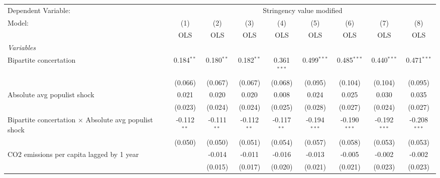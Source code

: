 
\begingroup
\centering
\begin{tabular}{lcccccccc}
   \toprule
   Dependent Variable: & \multicolumn{8}{c}{Stringency value modified}\\
   Model:                                                       & (1)           & (2)           & (3)           & (4)           & (5)            & (6)            & (7)            & (8)\\  
                                                                &  OLS          & OLS           & OLS           & OLS           & OLS            & OLS            & OLS            & OLS\\  
   \midrule
   \emph{Variables}\\
   Bipartite concertation                                       & 0.184$^{**}$  & 0.180$^{**}$  & 0.182$^{**}$  & 0.361$^{***}$ & 0.499$^{***}$  & 0.485$^{***}$  & 0.440$^{***}$  & 0.471$^{***}$\\   
                                                                & (0.066)       & (0.067)       & (0.067)       & (0.068)       & (0.095)        & (0.104)        & (0.104)        & (0.095)\\   
   Absolute avg populist shock                                  & 0.021         & 0.020         & 0.020         & 0.008         & 0.024          & 0.025          & 0.030          & 0.035\\   
                                                                & (0.023)       & (0.024)       & (0.024)       & (0.025)       & (0.028)        & (0.027)        & (0.024)        & (0.027)\\   
   Bipartite concertation $\times$ Absolute avg populist shock  & -0.112$^{**}$ & -0.111$^{**}$ & -0.112$^{**}$ & -0.117$^{**}$ & -0.194$^{***}$ & -0.190$^{***}$ & -0.192$^{***}$ & -0.208$^{***}$\\   
                                                                & (0.050)       & (0.050)       & (0.051)       & (0.054)       & (0.057)        & (0.058)        & (0.053)        & (0.053)\\   
   CO2 emissions per capita lagged by 1 year                    &               & -0.014        & -0.011        & -0.016        & -0.013         & -0.005         & -0.002         & -0.002\\   
                                                                &               & (0.015)       & (0.017)       & (0.020)       & (0.021)        & (0.021)        & (0.023)        & (0.023)\\   

\end{tabular}
